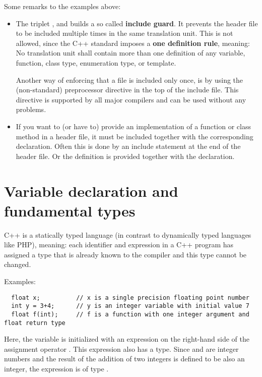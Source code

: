 Some remarks to the examples above:
\begin{itemize}
  \item The triplet ,  and  builds a so called \textbf{include guard}. It prevents the header file to be included multiple times in the same translation unit. This is not allowed, since the C++ standard imposes a \textbf{one definition rule}, meaning: No translation unit shall contain more than one definition of any variable, function, class type, enumeration type, or template.

  Another way of enforcing that a file is included only once, is by using the (non-standard) preprocessor directive  in the top of the include file. This directive is supported by all major compilers and can be used without any problems.

  \item If you want to (or have to) provide an implementation of a function or class method in a header file, it must be included together with the corresponding declaration. Often this is done by an include statement at the end of the header file. Or the definition is provided together with the declaration.
\end{itemize}


\section{Variable declaration and fundamental types\label{sec:data-type}}
C++ is a statically typed language (in contrast to dynamically typed languages like \eg PHP), meaning: each identifier and expression in a C++ program has assigned a type that is already known to the compiler and this type cannot be changed.

Examples:
\begin{verbatim}
  float x;          // x is a single precision floating point number
  int y = 3+4;      // y is an integer variable with initial value 7
  float f(int);     // f is a function with one integer argument and float return type
\end{verbatim}

Here, the variable  is initialized with an expression on the right-hand side of the assignment operator \cpp{=}. This expression  also has a type. Since  and  are integer numbers and the result of the addition of two integers is defined to be also an integer, the expression is of type .

